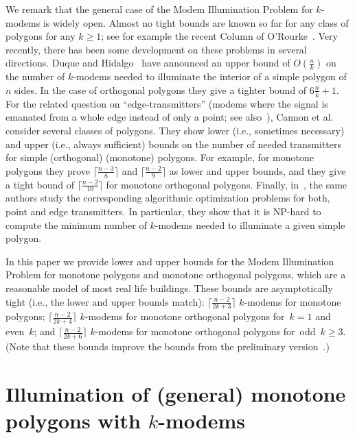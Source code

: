 \documentclass[A4]{article}
\begin{document}
We remark that the general case of the Modem Illumination Problem for \mbox{$k$-modems} is widely open.
Almost no tight bounds are known so far for any class of polygons for any $k \geq 1$; 
see for example the recent Column of O'Rourke~\cite{ORourke2}.
Very recently, there has been some development on these problems in several directions.
Duque and Hidalgo~\cite{DH} have announced
an upper bound of $O(\frac{n}{k})$ on the number of  \mbox{$k$-modems}
needed to illuminate the interior of a simple polygon of $n$ sides.
In the case of orthogonal polygons they give a tighter bound of $6\frac{n}{k}+1$.
For the related question on ``edge-transmitters'' (modems where the signal is emanated from a whole edge instead of only a point; see also~\cite{Shermer}), Cannon et al.~\cite{edgetrans} consider several classes of polygons.
They show lower (i.e., sometimes necessary) and upper (i.e., always sufficient) bounds on the number of needed transmitters for simple (orthogonal) (monotone) polygons.
For example, for monotone polygons they prove $\big\lceil\frac{n-3}{8}\big\rceil$ and $\big\lceil\frac{n-2}{9}\big\rceil$ as lower and upper bounds, and they give a tight bound of $\big\lceil\frac{n-2}{10}\big\rceil$ for monotone orthogonal polygons.
Finally, in~\cite{np}, the same authors study the corresponding algorithmic optimization problems for both, point and edge transmitters.
In particular, they show that it is NP-hard to compute the minimum number of \mbox{$k$-modems} needed to illuminate a given simple polygon. 



In this paper we provide lower and upper bounds for the Modem Illumination Problem for monotone polygons and monotone orthogonal polygons, which are a reasonable model of most real life buildings.
These bounds are asymptotically tight (i.e., the lower and upper bounds match):
$\big\lceil \frac{n-2}{2k+3} \big\rceil$ \mbox{$k$-modems} for monotone polygons;
$\big\lceil \frac{n-2}{2k+4} \big\rceil$ \mbox{$k$-modems} for monotone orthogonal polygons for~$k=1$ and even~$k$;
and $\big\lceil \frac{n-2}{2k+6} \big\rceil$ \mbox{$k$-modems} for monotone orthogonal polygons for~odd~$k\geq3$.
(Note that these bounds improve the bounds from the preliminary version~\cite{Aich}.)

\section{Illumination of (general) monotone polygons with $k$-modems}
\label{sec:gmono}
\end{document}
